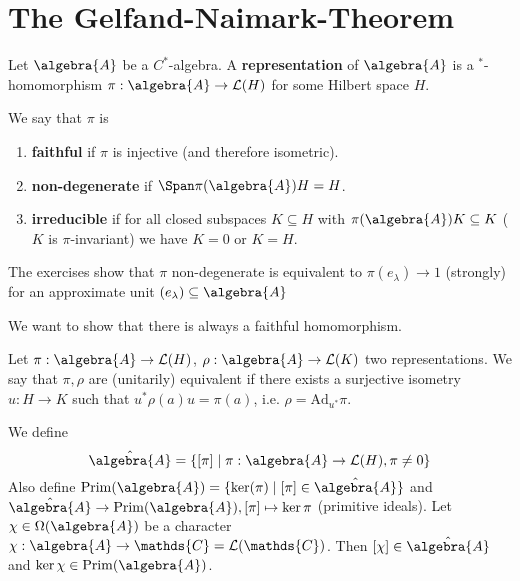 \documentclass[a4paper]{article}
\begin{document}
\section{The Gelfand-Naimark-Theorem}

\begin{definition}
	Let $\algebra{A}$ be a $C^*$-algebra.
	A \textbf{representation} of $\algebra{A}$ is a $^*$-homomorphism $\pi: \algebra{A} \to \mathcal{L}(H)$ for some Hilbert space $H$.

	
	We say that $\pi$ is
	\begin{enumerate}
		\item \textbf{faithful} if $\pi$ is injective (and therefore isometric).
		\item \textbf{non-degenerate} if $\Span \pi(\algebra{A}) H = H$.
		\item \textbf{irreducible} if for all closed subspaces $K \subseteq H$ with $\pi(\algebra{A})K \subseteq K $ ($K$ is $\pi$-invariant) we have $K = 0$ or $K = H$.
	\end{enumerate}
\end{definition}

\begin{remark}
	The exercises show that $\pi$ non-degenerate is equivalent to $\pi(e_\lambda) \to 1$ (strongly) for an approximate unit $(e_\lambda) \subseteq \algebra{A}$
\end{remark}

We want to show that there is always a faithful homomorphism.

\begin{definition}
	Let $\pi: \algebra{A} \to \mathcal{L}(H)$, $\rho: \algebra{A} \to \mathcal{L}(K)$ two representations. We say that $\pi, \rho$ are (unitarily) equivalent if there exists a surjective isometry $u: H \to K$ such that $u^* \rho(a) u = \pi(a)$, i.e. $\rho = \mathrm{Ad}_{u^*} \pi$.
\end{definition}

\begin{definition}[Spectrum]
	We define
	\begin{equation*}
		\hat{\algebra{A}} = \{[\pi] \mid \pi: \algebra{A} \to \mathcal{L}(H), \pi \neq 0\}
	\end{equation*}
	Also define $\mathrm{Prim}(\algebra{A}) = \{ \ker(\pi) \mid [\pi]\in \hat{\algebra{A}}\}$ and $\hat{\algebra{A}} \to \mathrm{Prim}(\algebra{A}), [\pi] \mapsto \ker \pi$ (primitive ideals). 
	Let $\chi \in \Omega(\algebra{A})$ be a character $\chi: \algebra{A} \to \mathds{C} = \mathcal{L}(\mathds{C})$.
	Then $[\chi] \in \hat{\algebra{A}}$ and $\ker \chi \in \mathrm{Prim}(\algebra{A})$.

\end{definition}
\end{document}

